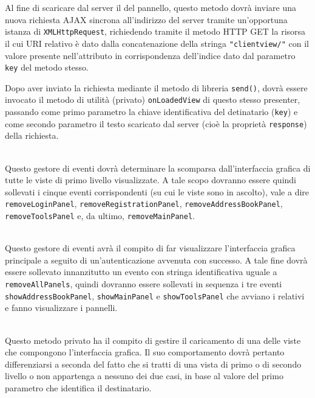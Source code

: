 \begin{description}
Al fine di scaricare dal server il  del pannello, questo metodo dovrà inviare una nuova richiesta AJAX sincrona all'indirizzo del server tramite un'opportuna istanza di \verb'XMLHttpRequest', richiedendo tramite il metodo HTTP GET la risorsa il cui URI relativo è dato dalla concatenazione della stringa \verb'"clientview/"' con il valore presente nell'attributo  in corrispondenza dell'indice dato dal parametro \verb'key' del metodo stesso.

Dopo aver inviato la richiesta mediante il metodo di libreria \verb'send()', dovrà essere invocato il metodo di utilità (privato) \verb'onLoadedView' di questo stesso presenter, passando come primo parametro la chiave identificativa del  detinatario (\texttt{key}) e come secondo parametro il testo scaricato dal server (cioè la proprietà \texttt{response}) della richiesta.

\item{}\\
Questo gestore di eventi dovrà determinare la scomparsa dall'interfaccia grafica di tutte le viste di primo livello visualizzate. A tale scopo dovranno essere quindi sollevati i cinque eventi corrispondenti (su cui le viste sono in ascolto), vale a dire \verb'removeLoginPanel', \verb'removeRegistrationPanel', \verb'removeAddressBookPanel', \verb'removeToolsPanel' e, da ultimo, \verb'removeMainPanel'.

\item{}\\
Questo gestore di eventi avrà il compito di far visualizzare l'interfaccia grafica principale a seguito di un'autenticazione avvenuta con successo. A tale fine dovrà essere sollevato innanzitutto un evento con stringa identificativa uguale a \verb'removeAllPanels', quindi dovranno essere sollevati in sequenza i tre eventi \verb'showAddressBookPanel', \verb'showMainPanel' e \verb'showToolsPanel' che avviano i relativi  e fanno visualizzare i pannelli.

\item{}\\
Questo metodo privato ha il compito di gestire il caricamento di una delle viste che compongono l'interfaccia grafica. Il suo comportamento dovrà pertanto differenziarsi a seconda del fatto che si tratti di una vista di primo o di secondo livello o non appartenga a nessuno dei due casi, in base al valore del primo parametro che identifica il  destinatario.


\end{description}
